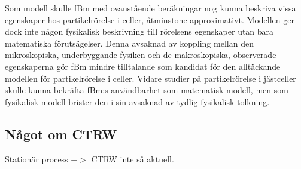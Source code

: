 Som modell skulle fBm med ovanstående beräkningar nog kunna beskriva vissa egenskaper hos partikelrörelse i celler, åtminstone approximativt. Modellen ger dock inte någon fysikalisk beskrivning till rörelsens egenskaper utan bara matematiska förutsägelser. Denna avsaknad av koppling mellan den mikroskopiska, underbyggande fysiken och de makroskopiska, observerade egenskaperna gör fBm mindre tilltalande som kandidat för den alltäckande modellen för partikelrörelse i celler. Vidare studier på partikelrörelse i jästceller skulle kunna bekräfta fBm:s användbarhet som matematisk modell, men som fysikalisk modell brister den i sin avsaknad av tydlig fysikalisk tolkning.

\subsection{Något om CTRW}
Stationär process $->$ CTRW inte så aktuell.


